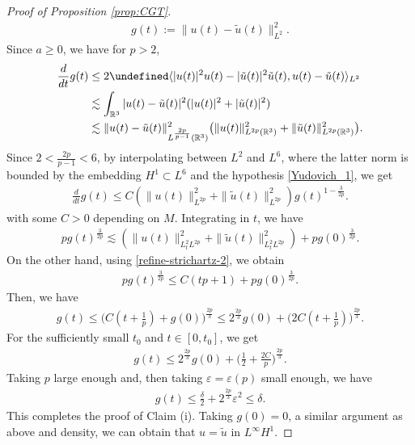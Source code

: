 \documentclass[10pt%
]{amsart}
\numberwithin{equation}{section}
\let\Im=\undefined\DeclareMathOperator*{\Im}{Im}
\newcommand{\R}{\mathbb{R}}
\theoremstyle{definition}
\begin{document}
\begin{proof}[Proof of Proposition \ref{prop:CGT}]
	\begin{align*}
		g(t):=\|u(t)-\tilde{u}(t)\|_{L^2}^2.
	\end{align*}
	Since $a\ge0$, we have for $p>2$, 
	\begin{align*}
		\frac{d}{dt}g(t)&\le 2\Im \langle|u(t)|^2u(t)-|\tilde{u}(t)|^2\tilde{u}(t),u(t)-\tilde{u}(t)\rangle_{L^2}\\
		&\lesssim \int_{\R^3}|u(t)-\tilde{u}(t)|^2(|u(t)|^2+|\tilde{u}(t)|^2)\\
		&\lesssim \| u(t)-\tilde{u}(t)\|_{L^{\frac{2p}{p-1}}(\R^3)}^2\big(\| u(t)\|_{L^{2p}(\R^3)}^2+\|\tilde{u}(t)\|_{L^{2p}(\R^3)}^2\big). 
	\end{align*}
	Since $2<\frac{2p}{p-1}<6$, by interpolating between $L^2$ and $L^6$, where the latter norm is bounded by the embedding $H^1\subset L^6$ and the hypothesis \eqref{Yudovich_1}, we get
	\begin{align*}
		\frac{d}{dt}g(t)\leq C(\|u(t)\|_{L^{2p}}^2+\|\tilde u(t)\|_{L^{2p}}^2)g(t)^{1-\frac{3}{2p}}.
	\end{align*}
	with some $C>0$ depending on $M$. Integrating in $t$, we have
	\begin{align}\label{integral}
		pg(t)^\frac{3}{2p}\lesssim(\|u(t)\|_{L_t^2L^{2p}}^2+\|\tilde u(t)\|_{L_t^2L^{2p}}^2)+pg(0)^\frac{3}{2p}.
	\end{align}
	On the other hand, using \eqref{refine-strichartz-2}, we obtain
	\begin{align*}
		pg(t)^\frac{3}{2p}\leq C(tp+1)+pg(0)^\frac{3}{2p}.
	\end{align*}
	Then, we have
	\begin{align*}
		g(t)\leq \Big(C(t+\frac1p)+g(0)\Big)^\frac{2p}{3}\leq 2^\frac{2p}{3}g(0)+\big(2C(t+\frac1p)\big)^\frac{2p}{3}.
	\end{align*}
	For the sufficiently small $t_0$ and $t\in[0,t_0]$, we get
	\begin{align*}
		g(t)\leq2^\frac{2p}{3}g(0)+\big(\frac{1}{2}+\frac{2C}{p}\big)^\frac{2p}{3}.
	\end{align*}
	Taking $p$ large enough and, then taking $\varepsilon=\varepsilon(p)$ small enough, we have
	\begin{align*}
		g(t)\leq \frac{\delta}{2}+2^\frac{2p}{3}\varepsilon^2\le \delta. 
	\end{align*}
	This completes the proof of Claim (i). Taking $g(0)=0$, a similar argument as above and density, we can obtain that $u=\tilde{u}$ in $L^\infty H^1$. 
	

\end{proof}
\end{document}
